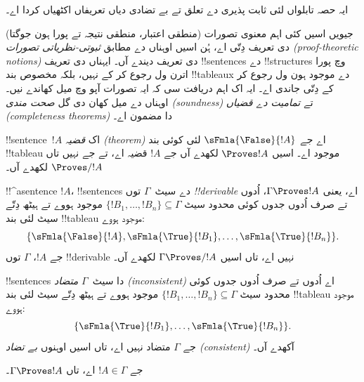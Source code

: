 \documentclass[../../../include/open-logic-section]{subfiles}
\begin{document}
      {}
      {}
      

\begin{editorial}
ایہ حصہ تابلواں لئی ثابت پذیری دے تعلق تے بے تضادی دیاں
تعریفاں اکٹھیاں کردا اے۔
\end{editorial}

\begin{explain}
جیویں اسیں کئی اہم معنوی تصورات (منطقی اعتبار، منطقی نتیجہ تے پورا ہون
جوگتا) دی تعریف دِتّی اے، ہُن اسیں اوہناں دے مطابق
\emph{ثبوتی-نظریاتی تصورات (proof-theoretic notions)} دی تعریف دیندے آں۔
ایہناں دی تعریف !!{sentence}s دے !!{structure}s وچ پورا اترن ول رجوع
کر کے نہیں، بلکہ مخصوص بند !!{tableau}x دے موجود ہون ول رجوع کر کے
دِتّی جاندی اے۔ ایہ اک اہم دریافت سی کہ ایہ تصورات آپو وچ میل کھاندے
نیں۔ اوہناں دے میل کھان دی گل \emph{صحت مندی (soundness)} تے
\emph{تمامیت دے قضیاں (completeness theorems)} دا مضمون اے۔
\end{explain}


\begin{defn}
!!{sentence}~$!A$ اک \emph{قضیہ (theorem)} اے جے
$\sFmla{\False}{!A}$ لئی کوئی بند !!{tableau} موجود اے۔ اسیں
$\Proves !A$ لکھدے آں جے $!A$ قضیہ اے، تے جے نہیں تاں
$\Proves/ !A$ لکھدے آں۔
\end{defn}

\begin{defn}[!!^{derivability}]
!!^a{sentence} $!A$، !!{sentence}s دے سیٹ~$\Gamma$ توں
\emph{!!{derivable}} اے، یعنی $\Gamma \Proves !A$، اُدوں تے صرف
اُدوں جدوں کوئی محدود سیٹ $\{!B_1, \dots, !B_n\} \subseteq \Gamma$
موجود ہووے تے ہیٹھ دِتّے سیٹ لئی بند !!{tableau} موجود ہووے:
\[
\{
  \sFmla{\False}{!A},
  \sFmla{\True}{!B_1}, \dots,
  \sFmla{\True}{!B_n}
  \}.
\]
جے $!A$، $\Gamma$ توں !!{derivable} نہیں اے، تاں اسیں
$\Gamma \Proves/ !A$ لکھدے آں۔
\end{defn}

\begin{defn}
!!{sentence}s دا سیٹ~$\Gamma$ \emph{متضاد (inconsistent)} اے اُدوں تے
صرف اُدوں جدوں کوئی محدود سیٹ $\{!B_1, \dots, !B_n\} \subseteq
\Gamma$ موجود ہووے تے ہیٹھ دِتّے سیٹ لئی بند !!{tableau} موجود ہووے:
\[
\{
  \sFmla{\True}{!B_1}, \dots,
  \sFmla{\True}{!B_n}  
  \}.
\]
جے $\Gamma$ متضاد نہیں اے، تاں اسیں اوہنوں \emph{بے تضاد
(consistent)} آکھدے آں۔
\end{defn}

\begin{prop}
جے $!A \in \Gamma$ اے، تاں $\Gamma \Proves !A$۔
\end{prop}
\end{document}
